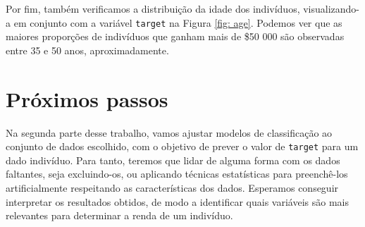 \documentclass[a4paper, 12pt]{article}
\begin{document}
Por fim, também verificamos a distribuição da idade dos indivíduos, visualizando-a em conjunto com a variável \verb|target| na Figura \ref{fig: age}.
Podemos ver que as maiores proporções de indivíduos que ganham mais de \$50 000 são observadas entre 35 e 50 anos, aproximadamente.

\section{Próximos passos}

Na segunda parte desse trabalho, vamos ajustar modelos de classificação ao conjunto de dados escolhido, com o objetivo de prever o valor de \verb|target| para um dado indivíduo.
Para tanto, teremos que lidar de alguma forma com os dados faltantes, seja excluindo-os, ou aplicando técnicas estatísticas para preenchê-los artificialmente respeitando as características dos dados.
Esperamos conseguir interpretar os resultados obtidos, de modo a identificar quais variáveis são mais relevantes para determinar a renda de um indivíduo.
\end{document}
